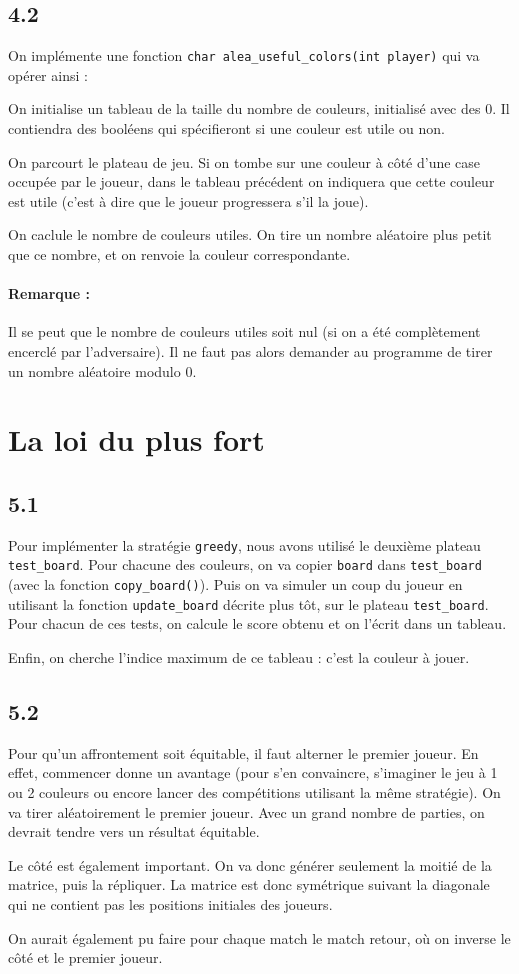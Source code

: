 \documentclass[12pt]{article}
\def\question#1{\subsection*{#1}}
\def\sec#1{\section{#1}}
\begin{document}
\question{4.2}
On implémente une fonction \texttt{char alea\_useful\_colors(int player)} qui va opérer ainsi :

On initialise un tableau de la taille du nombre de couleurs, initialisé avec des 0. Il contiendra des booléens qui spécifieront si une couleur est utile ou non.

On parcourt le plateau de jeu. Si on tombe sur une couleur à côté d'une case occupée par le joueur, dans le tableau précédent on indiquera que cette couleur est utile (c'est à dire que le joueur progressera s'il la joue).

On caclule le nombre de couleurs utiles. On tire un nombre aléatoire plus petit que ce nombre, et on renvoie la couleur correspondante.

\paragraph{Remarque :} Il se peut que le nombre de couleurs utiles soit nul (si on a été complètement encerclé par l'adversaire). Il ne faut pas alors demander au programme de tirer un nombre aléatoire modulo 0.

\sec{La loi du plus fort}
\question{5.1}
Pour implémenter la stratégie \texttt{greedy}, nous avons utilisé le deuxième plateau \texttt{test\_board}.
Pour chacune des couleurs, on va copier \texttt{board} dans \texttt{test\_board} (avec la fonction \texttt{copy\_board()}). Puis on va simuler un coup du joueur en utilisant la fonction \texttt{update\_board} décrite plus tôt, sur le plateau \texttt{test\_board}. Pour chacun de ces tests, on calcule le score obtenu et on l'écrit dans un tableau.

Enfin, on cherche l'indice maximum de ce tableau : c'est la couleur à jouer.


\question{5.2}
Pour qu'un affrontement soit équitable, il faut alterner le premier joueur. En effet, commencer donne un avantage (pour s'en convaincre, s'imaginer le jeu à 1 ou 2 couleurs ou encore lancer des compétitions utilisant la même stratégie). On va tirer aléatoirement le premier joueur. Avec un grand nombre de parties, on devrait tendre vers un résultat équitable.

Le côté est également important. On va donc générer seulement la moitié de la matrice, puis la répliquer. La matrice est donc symétrique suivant la diagonale qui ne contient pas les positions initiales des joueurs. 

On aurait également pu faire pour chaque match le match retour, où on inverse le côté et le premier joueur.
\end{document}

